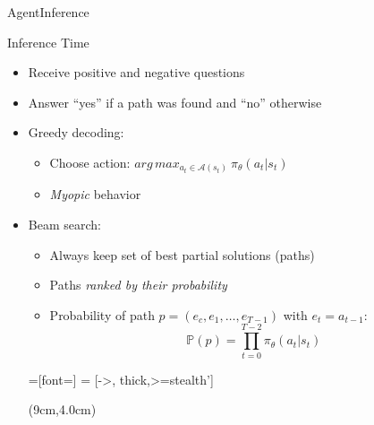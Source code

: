 \documentclass[table]{beamer}
\begin{document}
\begin{frame}{Agent}{Inference}

\begin{block}{Inference Time}
  \begin{itemize}
  \item Receive positive and negative questions
  \item Answer ``yes'' if a path was found and ``no'' otherwise
  \end{itemize}
\end{block}

\vspace{-0.2cm}
\begin{itemize}
  \item<2-> Greedy decoding:
  \begin{itemize}
    \item Choose action: $arg\,max_{a_t \in \mathcal{A}(s_t)} \ \pi_{\theta}(a_t | s_t)$
    \item \emph{Myopic} behavior
  \end{itemize}
  \item<3-> Beam search:
  \begin{itemize}
    \item Always keep set of best partial solutions (paths)
    \item Paths \emph{ranked by their probability}
    \item Probability of path $p = (e_c,e_1, \dots, e_{T-1})$ with $e_t = a_{t-1}$:
    \begin{equation*}
  \mathbb{P}(p) = \prod_{t=0}^{T-2} \pi_{\theta}(a_t |s_t)
      \end{equation*}
  \end{itemize}
  \tikzset{>=triangle 45}
  \tikzset{every picture/.style=thick}
  =[font=\small]
     = [->, thick,>=stealth']
  
  
  \vspace{-0.5cm}
  \begin{textblock*}{5cm}(9cm,4.0cm) 
\end{textblock*}
\end{itemize}
\end{frame}
\end{document}
